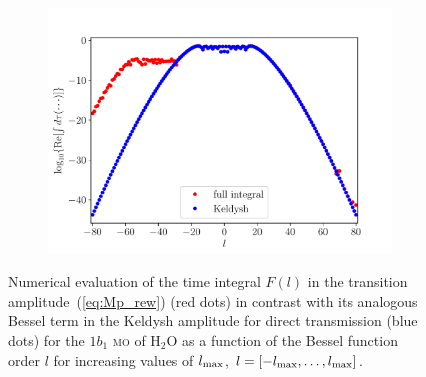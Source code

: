 \begin{figure}
\begin{subfigure}[b]{0.33\linewidth}
    \includegraphics[width=\textwidth]{figures/ch_ATI_SFA/1b1/l80n512WP50PG25MR35vsKeldysh.pdf}
  \end{subfigure}
  \caption{Numerical evaluation of the time integral $F(l)$ in the
    transition amplitude~(\ref{eq:Mp_rew}) (red dots) in contrast with
    its analogous Bessel term in the Keldysh amplitude for direct
    transmission (blue dots) for the $1b_{1}$ \textsc{mo} of H$_{2}$O
    as a function of the Bessel function order $l$ for increasing
    values of $l_{\rm{max}}$, $l=[ -l_{\rm{max}} , \dots,
      l_{\rm{max}}]$.}
    \label{fig:1b1_vs_keldysh}
\end{figure}

